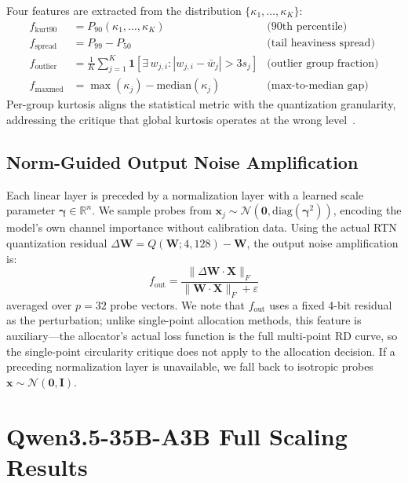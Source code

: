 \documentclass{article}
\begin{document}
Four features are extracted from the distribution $\{\kappa_1, \ldots, \kappa_K\}$:
\begin{align}
    f_{\text{kurt90}} &= P_{90}(\kappa_1, \ldots, \kappa_K) & \text{(90th percentile)} \\
    f_{\text{spread}} &= P_{99} - P_{50} & \text{(tail heaviness spread)} \\
    f_{\text{outlier}} &= \frac{1}{K} \sum_{j=1}^{K} \mathbf{1}[\exists\, w_{j,i} : |w_{j,i} - \bar{w}_j| > 3s_j] & \text{(outlier group fraction)} \\
    f_{\text{maxmed}} &= \max(\kappa_j) - \text{median}(\kappa_j) & \text{(max-to-median gap)}
\end{align}
Per-group kurtosis aligns the statistical metric with the quantization granularity, addressing the critique that global kurtosis operates at the wrong level~\cite{zhao2025kurtail}.

\subsection{Norm-Guided Output Noise Amplification}

Each linear layer is preceded by a normalization layer with a learned scale parameter $\boldsymbol{\gamma} \in \mathbb{R}^n$. We sample probes from $\mathbf{x}_j \sim \mathcal{N}(\mathbf{0}, \text{diag}(\boldsymbol{\gamma}^2))$, encoding the model's own channel importance without calibration data. Using the actual RTN quantization residual $\Delta \mathbf{W} = Q(\mathbf{W}; 4, 128) - \mathbf{W}$, the output noise amplification is:
\begin{equation}
    f_{\text{out}} = \frac{\|\Delta \mathbf{W} \cdot \mathbf{X}\|_F}{\|\mathbf{W} \cdot \mathbf{X}\|_F + \varepsilon}
\end{equation}
averaged over $p = 32$ probe vectors. We note that $f_{\text{out}}$ uses a fixed 4-bit residual as the perturbation; unlike single-point allocation methods, this feature is auxiliary---the allocator's actual loss function is the full multi-point RD curve, so the single-point circularity critique does not apply to the allocation decision. If a preceding normalization layer is unavailable, we fall back to isotropic probes $\mathbf{x} \sim \mathcal{N}(\mathbf{0}, \mathbf{I})$.

\section{Qwen3.5-35B-A3B Full Scaling Results}
\label{app:qwen35_full}
\end{document}
